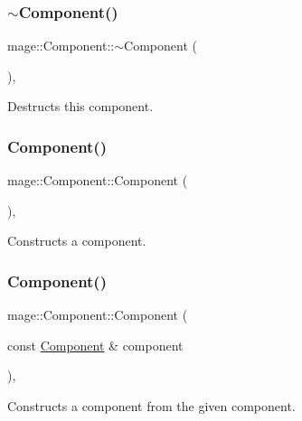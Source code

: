\subsubsection{\texorpdfstring{$\sim$\+Component()}{~Component()}}
{\footnotesize\ttfamily mage\+::\+Component\+::$\sim$\+Component (\begin{DoxyParamCaption}{ }\end{DoxyParamCaption})\hspace{0.3cm}{\ttfamily [virtual]}, {\ttfamily [default]}}

Destructs this component. \mbox{\label{classmage_1_1_component_aef66a6573c094143bf95d3a81df1098e}} 
\subsubsection{\texorpdfstring{Component()}{Component()}\hspace{0.1cm}{\footnotesize\ttfamily [1/3]}}
{\footnotesize\ttfamily mage\+::\+Component\+::\+Component (\begin{DoxyParamCaption}{ }\end{DoxyParamCaption})\hspace{0.3cm}{\ttfamily [protected]}, {\ttfamily [noexcept]}}

Constructs a component. \mbox{\label{classmage_1_1_component_abcd9e6ba7f9691f51d1802d5cf8a365a}} 
\subsubsection{\texorpdfstring{Component()}{Component()}\hspace{0.1cm}{\footnotesize\ttfamily [2/3]}}
{\footnotesize\ttfamily mage\+::\+Component\+::\+Component (\begin{DoxyParamCaption}\item[{const \mbox{\hyperlink{classmage_1_1_component}{Component}} \&}]{component }\end{DoxyParamCaption})\hspace{0.3cm}{\ttfamily [protected]}, {\ttfamily [noexcept]}}

Constructs a component from the given component.


